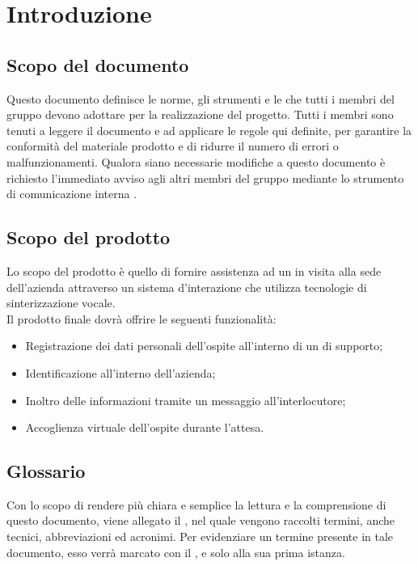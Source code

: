 \documentclass[../NormeDiProgetto.tex]{subfiles}
\begin{document}
\section{Introduzione}

    \subsection{Scopo del documento}
    Questo documento definisce le norme, gli strumenti e le  che tutti i membri del gruppo devono adottare per la realizzazione del progetto. Tutti i membri sono tenuti a leggere il documento e ad applicare le regole qui definite, per garantire la conformità del materiale prodotto e di ridurre il numero di errori o malfunzionamenti. Qualora siano necessarie modifiche a questo documento è richiesto l'immediato avviso agli altri membri del gruppo mediante lo strumento di comunicazione interna .

    \subsection{Scopo del prodotto}
	Lo scopo del prodotto è quello di fornire assistenza ad un  in visita alla sede dell'azienda attraverso un sistema d'interazione che utilizza tecnologie di sinterizzazione vocale.
	\\Il prodotto finale dovrà offrire le seguenti funzionalità:
	\begin{itemize}
		\item Registrazione dei dati personali dell'ospite all'interno di un  di supporto;
		\item Identificazione  all'interno dell'azienda;
		\item Inoltro delle informazioni tramite un messaggio  all'interlocutore;
		\item Accoglienza virtuale dell'ospite durante l'attesa.
	\end{itemize}

    \subsection{Glossario}
	Con lo scopo di rendere più chiara e semplice la lettura e la comprensione di questo documento, viene allegato il \glossariov, nel quale vengono raccolti termini, anche tecnici, abbreviazioni ed acronimi. Per evidenziare un termine presente in tale documento, esso verrà marcato con il , e solo alla sua prima istanza.
\end{document}
